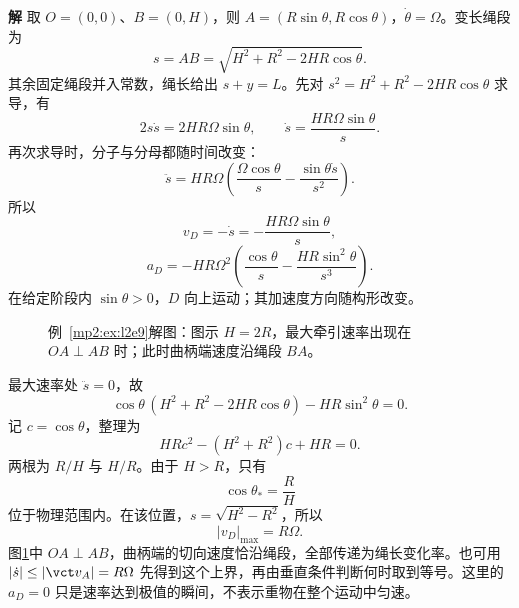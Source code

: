 \documentclass[11pt,openany,fontset=fandol]{ctexbook}
\theoremstyle{definition}\newtheorem{example}{例}[chapter]\newtheorem{exercise}{习题}[chapter]
\newcommand{\SolutionStart}{\par\medskip\ifdim\pagetotal>0pt\ifdim\dimexpr\pagegoal-\pagetotal\relax<3\baselineskip\newpage\fi\fi\noindent\textbf{解}\quad\ignorespaces}
\newenvironment{solution}{\SolutionStart}{\par\medskip}
\begin{document}
\begin{solution}
取 $O=(0,0)$、$B=(0,H)$，则 $A=(R\sin\theta,R\cos\theta)$，$\dot\theta=\Omega$。变长绳段为
\[
s=AB=\sqrt{H^2+R^2-2HR\cos\theta}.
\]
其余固定绳段并入常数，绳长给出 $s+y=L$。先对 $s^2=H^2+R^2-2HR\cos\theta$ 求导，有
\[
2s\dot s=2HR\Omega\sin\theta,\qquad
\dot s=\frac{HR\Omega\sin\theta}{s}.
\]
再次求导时，分子与分母都随时间改变：
\[
\ddot s=HR\Omega\left(\frac{\Omega\cos\theta}{s}
-\frac{\sin\theta\dot s}{s^2}\right).
\]
所以
\[
v_D=-\dot s=-\frac{HR\Omega\sin\theta}{s},
\]
\[
a_D=-HR\Omega^2
\left(\frac{\cos\theta}{s}-\frac{HR\sin^2\theta}{s^3}\right).
\]
在给定阶段内 $\sin\theta>0$，$D$ 向上运动；其加速度方向随构形改变。

\begin{figure}[H]\centering
{}
\caption{例~\ref{mp2:ex:l2e9}解图：图示 $H=2R$，最大牵引速率出现在 $OA\perp AB$ 时；此时曲柄端速度沿绳段 $BA$。}\label{mp2:fig:l2e9-s}
\end{figure}

最大速率处 $\ddot s=0$，故
\[
\cos\theta\,(H^2+R^2-2HR\cos\theta)-HR\sin^2\theta=0.
\]
记 $c=\cos\theta$，整理为
\[
HRc^2-(H^2+R^2)c+HR=0.
\]
两根为 $R/H$ 与 $H/R$。由于 $H>R$，只有
\[
\cos\theta_* =\frac RH
\]
位于物理范围内。在该位置，$s=\sqrt{H^2-R^2}$，所以
\[
|v_D|_{\max}=R\Omega.
\]
图\ref{mp2:fig:l2e9-s}中 $OA\perp AB$，曲柄端的切向速度恰沿绳段，全部传递为绳长变化率。也可用 $|\dot s|\le|\vct v_A|=R\Omega$ 先得到这个上界，再由垂直条件判断何时取到等号。这里的 $a_D=0$ 只是速率达到极值的瞬间，不表示重物在整个运动中匀速。


\end{solution}
\end{document}
